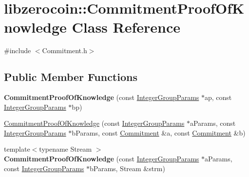\hypertarget{classlibzerocoin_1_1_commitment_proof_of_knowledge}{}\section{libzerocoin\+:\+:Commitment\+Proof\+Of\+Knowledge Class Reference}
\label{classlibzerocoin_1_1_commitment_proof_of_knowledge}


{\ttfamily \#include $<$Commitment.\+h$>$}

\subsection*{Public Member Functions}
\begin{DoxyCompactItemize}
\item 
\mbox{\label{classlibzerocoin_1_1_commitment_proof_of_knowledge_abd9cc734a10562911a8cb644b132faf0}} 
{\bfseries Commitment\+Proof\+Of\+Knowledge} (const \mbox{\hyperlink{classlibzerocoin_1_1_integer_group_params}{Integer\+Group\+Params}} $\ast$ap, const \mbox{\hyperlink{classlibzerocoin_1_1_integer_group_params}{Integer\+Group\+Params}} $\ast$bp)
\item 
\mbox{\hyperlink{classlibzerocoin_1_1_commitment_proof_of_knowledge_af66449f2c4c0cb88d19cb409b67b4cff}{Commitment\+Proof\+Of\+Knowledge}} (const \mbox{\hyperlink{classlibzerocoin_1_1_integer_group_params}{Integer\+Group\+Params}} $\ast$a\+Params, const \mbox{\hyperlink{classlibzerocoin_1_1_integer_group_params}{Integer\+Group\+Params}} $\ast$b\+Params, const \mbox{\hyperlink{classlibzerocoin_1_1_commitment}{Commitment}} \&a, const \mbox{\hyperlink{classlibzerocoin_1_1_commitment}{Commitment}} \&b)
\item 
\mbox{\label{classlibzerocoin_1_1_commitment_proof_of_knowledge_a66ce19383e17227c631bd47ebc7e93a0}} 
{\footnotesize template$<$typename Stream $>$ }\\{\bfseries Commitment\+Proof\+Of\+Knowledge} (const \mbox{\hyperlink{classlibzerocoin_1_1_integer_group_params}{Integer\+Group\+Params}} $\ast$a\+Params, const \mbox{\hyperlink{classlibzerocoin_1_1_integer_group_params}{Integer\+Group\+Params}} $\ast$b\+Params, Stream \&strm)
\item 
\mbox{\label{classlibzerocoin_1_1_commitment_proof_of_knowledge_a267631e6e1829578b8ea6073c21c8d96}} 

\end{DoxyCompactItemize}

